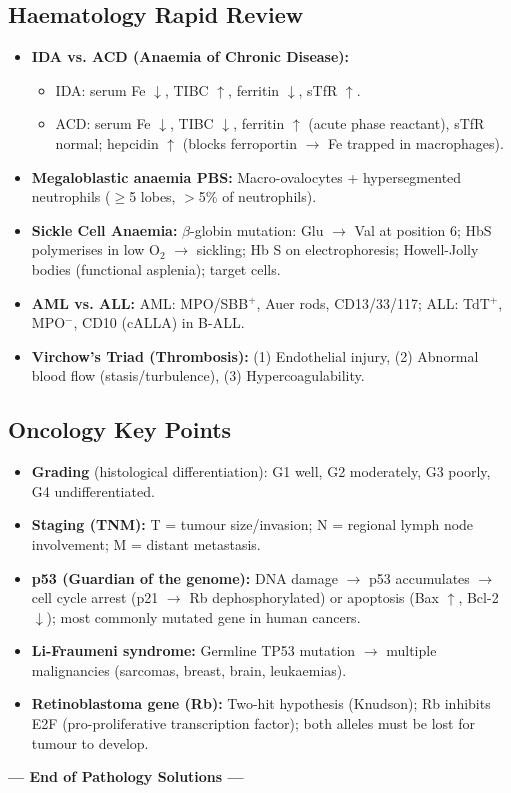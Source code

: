 \documentclass[11pt,a4paper]{article}
\begin{document}
\subsection{Haematology Rapid Review}
\begin{itemize}[leftmargin=*]
    \item \textbf{IDA vs. ACD (Anaemia of Chronic Disease):}
    \begin{itemize}
        \item IDA: serum Fe $\downarrow$, TIBC $\uparrow$, ferritin $\downarrow$, sTfR $\uparrow$.
        \item ACD: serum Fe $\downarrow$, TIBC $\downarrow$, ferritin $\uparrow$ (acute phase reactant), sTfR normal; hepcidin $\uparrow$ (blocks ferroportin $\rightarrow$ Fe trapped in macrophages).
    \end{itemize}
    \item \textbf{Megaloblastic anaemia PBS:} Macro-ovalocytes + hypersegmented neutrophils ($\geq$5 lobes, $>$5\% of neutrophils).
    \item \textbf{Sickle Cell Anaemia:} $\beta$-globin mutation: Glu $\rightarrow$ Val at position 6; HbS polymerises in low O$_2$ $\rightarrow$ sickling; Hb S on electrophoresis; Howell-Jolly bodies (functional asplenia); target cells.
    \item \textbf{AML vs. ALL:} AML: MPO/SBB$^+$, Auer rods, CD13/33/117; ALL: TdT$^+$, MPO$^-$, CD10 (cALLA) in B-ALL.
    \item \textbf{Virchow's Triad (Thrombosis):} (1) Endothelial injury, (2) Abnormal blood flow (stasis/turbulence), (3) Hypercoagulability.
\end{itemize}

\subsection{Oncology Key Points}
\begin{itemize}[leftmargin=*]
    \item \textbf{Grading} (histological differentiation): G1 well, G2 moderately, G3 poorly, G4 undifferentiated.
    \item \textbf{Staging (TNM):} T = tumour size/invasion; N = regional lymph node involvement; M = distant metastasis.
    \item \textbf{p53 (Guardian of the genome):} DNA damage $\rightarrow$ p53 accumulates $\rightarrow$ cell cycle arrest (p21 $\rightarrow$ Rb dephosphorylated) or apoptosis (Bax $\uparrow$, Bcl-2 $\downarrow$); most commonly mutated gene in human cancers.
    \item \textbf{Li-Fraumeni syndrome:} Germline TP53 mutation $\rightarrow$ multiple malignancies (sarcomas, breast, brain, leukaemias).
    \item \textbf{Retinoblastoma gene (Rb):} Two-hit hypothesis (Knudson); Rb inhibits E2F (pro-proliferative transcription factor); both alleles must be lost for tumour to develop.
\end{itemize}

\vspace{1cm}
\begin{center}
\textbf{--- End of Pathology Solutions ---}
\end{center}
\end{document}
